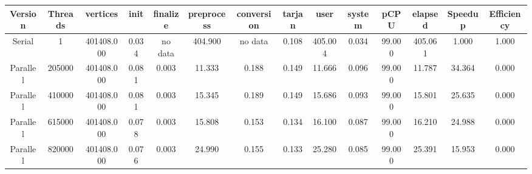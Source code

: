 \begin{tabular}{|c|c|c|c|c|c|c|c|c|c|c|c|c|c|}
\toprule
 Version &  Threads &   vertices &  init & finalize &  preprocess & conversion &  tarjan &    user &  system &   pCPU &  elapsed &  Speedup &  Efficiency \\
\midrule
  Serial &        1 & 401408.000 & 0.034 &  no data &     404.900 &    no data &   0.108 & 405.004 &   0.034 & 99.000 &  405.061 &    1.000 &       1.000 \\
Parallel &   205000 & 401408.000 & 0.081 &    0.003 &      11.333 &      0.188 &   0.149 &  11.666 &   0.096 & 99.000 &   11.787 &   34.364 &       0.000 \\
Parallel &   410000 & 401408.000 & 0.081 &    0.003 &      15.345 &      0.189 &   0.149 &  15.686 &   0.093 & 99.000 &   15.801 &   25.635 &       0.000 \\
Parallel &   615000 & 401408.000 & 0.078 &    0.003 &      15.808 &      0.153 &   0.134 &  16.100 &   0.087 & 99.000 &   16.210 &   24.988 &       0.000 \\
Parallel &   820000 & 401408.000 & 0.076 &    0.003 &      24.990 &      0.155 &   0.133 &  25.280 &   0.085 & 99.000 &   25.391 &   15.953 &       0.000 \\
\bottomrule
\end{tabular}
